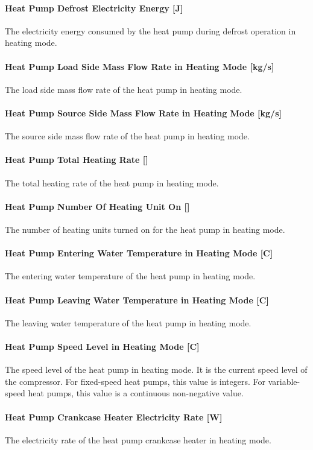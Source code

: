 \paragraph{Heat Pump Defrost Electricity Energy {[}J{]}} The electricity energy
consumed by the heat pump during defrost operation in heating mode.
\paragraph{Heat Pump Load Side Mass Flow Rate in Heating Mode {[}kg/s{]}} The
load side mass flow rate of the heat pump in heating mode.
\paragraph{Heat Pump Source Side Mass Flow Rate in Heating Mode {[}kg/s{]}} The
source side mass flow rate of the heat pump in heating mode.
\paragraph{Heat Pump Total Heating Rate {[}{]}} The total heating rate of the
heat pump in heating mode.
\paragraph{Heat Pump Number Of Heating Unit On {[}{]}} The number of heating
units turned on for the heat pump in heating mode.
\paragraph{Heat Pump Entering Water Temperature in Heating Mode {[}C{]}} The
entering water temperature of the heat pump in heating mode.
\paragraph{Heat Pump Leaving Water Temperature in Heating Mode {[}C{]}} The
leaving water temperature of the heat pump in heating mode.
\paragraph{Heat Pump Speed Level in Heating Mode {[}C{]}} The speed level of the
heat pump in heating mode. It is the current speed level of the compressor. For
fixed-speed heat pumps, this value is integers. For variable-speed heat pumps,
this value is a continuous non-negative value.
\paragraph{Heat Pump Crankcase Heater Electricity Rate {[}W{]}} The electricity
rate of the heat pump crankcase heater in heating mode.
